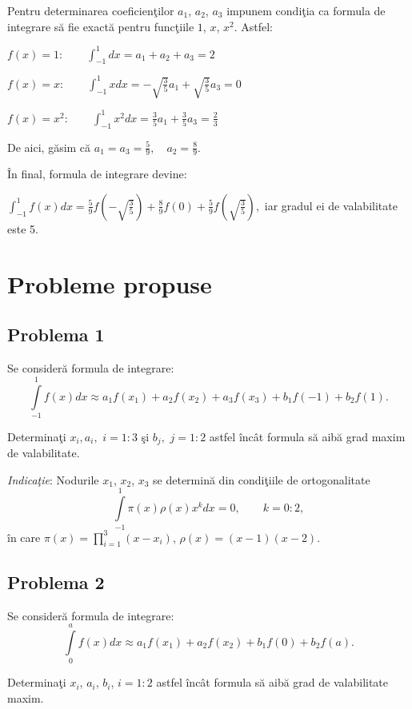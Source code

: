 \documentclass{exam}
\begin{document}
Pentru determinarea coeficien\c{t}ilor $a_1$, $a_2$, $a_3$ impunem condi\c{t}ia ca formula de integrare s\u{a} fie exact\u{a} pentru func\c{t}iile $1$, $x$, $x^2$. Astfel:

$f(x) = 1: \qquad \int_{-1}^{1}dx=a_1+a_2+a_3=2 $

$f(x) = x: \qquad \int_{-1}^{1}xdx=-\sqrt{\frac{3}{5}}a_1+\sqrt{\frac{3}{5}}a_3=0 $

$f(x) = x^2: \qquad \int_{-1}^{1}x^2dx=\frac{3}{5}a_1+\frac{3}{5}a_3=\frac{2}{3}$

De aici, g\u{a}sim c\u{a} $a_1=a_3=\frac{5}{9},\quad a_2=\frac{8}{9}$.

\^{I}n final, formula de integrare devine:

$ \int_{-1}^1 f\left(x\right) dx=\frac{5}{9}f\left(-\sqrt{\frac{3}{5}}\right)+\frac{8}{9}f(0)+\frac{5}{9}f\left(\sqrt{\frac{3}{5}}\right), $
iar gradul ei de valabilitate este 5.

\section{Probleme propuse}

\subsection{Problema 1}
Se consider\u{a} formula de integrare:
$$\int\limits_{-1}^1f(x)dx\approx a_1f(x_1)+a_2f(x_2)+a_3f(x_3)+b_1f(-1)+b_2f(1).$$

Determina\c{t}i $x_i, a_i,$ $i=1:3$ \c{s}i $b_j,$ $j=1:2$ astfel \^{i}nc\^{a}t formula s\u{a} aib\u{a} grad maxim de valabilitate.

\textit{Indica\c{t}ie}: Nodurile $x_1$, $x_2$, $x_3$ se determin\u{a} din condi\c{t}iile de ortogonalitate
$$ \int\limits_{-1}^1\pi(x)\rho(x)x^kdx=0, \qquad k=0:2, $$
\^{i}n care $\pi(x)=\prod\limits_{i=1}^{3}(x-x_i)$, $\rho(x)=(x-1)(x-2)$.

\subsection{Problema 2}
Se consider\u{a} formula de integrare:
$$\int\limits_0^af(x)dx\approx a_1f(x_1)+a_2f(x_2)+b_1f(0)+b_2f(a).$$

Determina\c{t}i $x_i$, $a_i$, $b_i$, $i=1:2$ astfel \^{i}nc\^{a}t formula s\u{a} aib\u{a} grad de valabilitate maxim.
\end{document}
